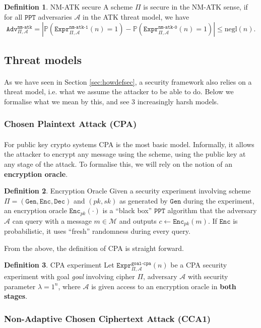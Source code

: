 \documentclass{article}
\theoremstyle{definition}
\newtheorem{definition}{Definition}[section]
\newcommand{\Enc}{\texttt{Enc}}
\newcommand{\Dec}{\texttt{Dec}}
\newcommand{\Gen}{\texttt{Gen}}
\newcommand{\M}{\mathcal{M}}
\newcommand{\A}{\mathcal{A}}
\newcommand{\Prob}{\mathbb{P}}
\newcommand{\PPT}{\texttt{PPT}}
\newcommand{\negl}{\text{negl}}
\newcommand{\Expr}[2]{\texttt{Expr}^{\texttt{#1}}_{#2}}
\newcommand{\Adv}[2]{\texttt{Adv}^{\texttt{#1}}_{#2}}
\begin{document}
\begin{definition}{NM-ATK secure}
 A scheme $\Pi$ is secure in the NM-ATK sense, if for all $\PPT$ adversaries
 $\A$ in the ATK threat model, we have
 \[
   \Adv{nm-atk}{\Pi, \A} = |\Prob(\Expr{nm-atk-1}{\Pi, \A}(n) = 1) -
   \Prob(\Expr{nm-atk-0}{\Pi, \A}(n) = 1)| \leq \negl(n).
 \]
\end{definition}
\subsection{Threat models}
\paragraph{} As we have seen in Section \ref{sec:howdefsec}, a security
framework also relies on a threat model, i.e. what we assume the attacker to be
able to do. Below we formalise what we mean by this, and see 3 increasingly
harsh models.
\subsubsection{Chosen Plaintext Attack (CPA)}
\paragraph{} For public key crypto systems CPA is the most basic model.
Informally, it allows the attacker to encrypt any message using the scheme,
using the public key at any stage of the attack. To formalise this, we will rely
on the notion of an \textbf{encryption oracle}.
\begin{definition}{Encryption Oracle}
  Given a security experiment involving scheme $\Pi = (\Gen, \Enc, \Dec)$ and
  $(pk, sk)$ as generated by $\Gen$ during the experiment, an encryption oracle
  $\Enc_{pk}(\cdot)$ is a ``black box'' $\PPT$ algorithm that the adversary $\A$ 
  can query with a message $m\in \M$ and outputs $c \leftarrow \Enc_{pk}(m)$. If
  $\Enc$ is probabilistic, it uses ``fresh'' randomness during every query.
\end{definition}
From the above, the definition of CPA is straight forward.
\begin{definition}{CPA experiment}
  Let $\Expr{goal-cpa}{\Pi, \A}(n)$ be a CPA security experiment with goal
  \textit{goal} involving cipher $\Pi$, adversary $\A$ with security parameter $\lambda = 1^n$, where
  $\A$ is given access to an encryption oracle in \textbf{both stages}.
\end{definition}
\subsubsection{Non-Adaptive Chosen Ciphertext Attack (CCA1)}
\end{document}
